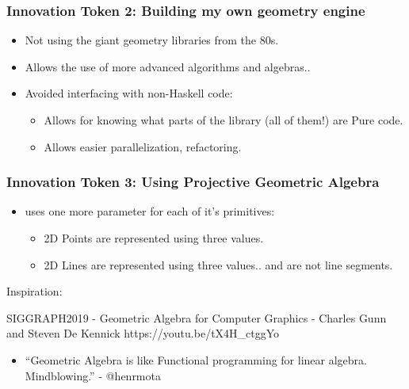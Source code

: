 \documentclass[hyperref={pdfpagemode=FullScreen},aspectratio=169]{beamer}
\begin{document}
\begin{frame}
  \frametitle{Innovation Token 2: Building my own geometry engine}
  \begin{itemize}
  \item Not using the giant geometry libraries from the 80s.
  \item Allows the use of more advanced algorithms and algebras..
  \item Avoided interfacing with non-Haskell code:
    \begin{itemize}
    \item Allows for knowing what parts of the library (all of them!) are Pure code.
    \item Allows easier parallelization, refactoring.
    \end{itemize}
  \end{itemize}
\end{frame}

\begin{frame}
  \frametitle{Innovation Token 3: Using Projective Geometric Algebra}
  \begin{itemize}
  \item uses one more parameter for each of it's primitives:
    \begin{itemize}
    \item 2D Points are represented using three values.
    \item 2D Lines are represented using three values.. and are not line segments.
    \end{itemize}
  \end{itemize}
  Inspiration:
  \begin{block}{SIGGRAPH2019 - Geometric Algebra for Computer Graphics - Charles Gunn and Steven De Kennick}
    https://youtu.be/tX4H\_ctggYo
  \end{block}
  \begin{itemize}
  \item ``Geometric Algebra is like Functional programming for linear algebra. Mindblowing.'' - @henrmota
  \end{itemize}
\end{frame}
\end{document}
